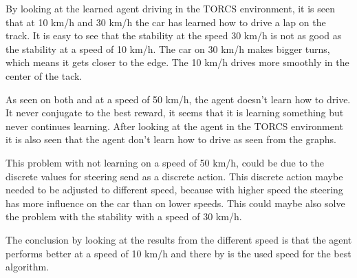 By looking at the learned agent driving in the TORCS environment, it is seen that at 10 km/h and 30 km/h the car has learned how to drive a lap on the track. It is easy to see that the stability at the speed 30 km/h is not as good as the stability at a speed of 10 km/h. The car on 30 km/h makes bigger turns, which means it gets closer to the edge. The 10 km/h drives more smoothly in the center of the tack. 

As seen on both  and  at a speed of 50 km/h, the agent doesn't learn how to drive. It never conjugate to the best reward, it seems that it is learning something but never continues learning. After looking at the agent in the TORCS environment it is also seen that the agent don't learn how to drive as seen from the graphs.  

This problem with not learning on a speed of 50 km/h, could be due to the discrete values for steering send as a discrete action. This discrete action maybe needed to be adjusted to different speed, because with higher speed the steering has more influence on the car than on lower speeds. This could maybe also solve the problem with the stability with a speed of 30 km/h. 

The conclusion by looking at the results from the different speed is that the agent performs better at a speed of 10 km/h and there by is the used speed for the best algorithm. 
    